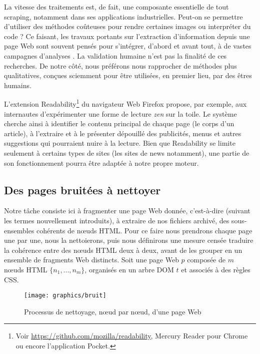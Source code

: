 \documentclass[symmetric,justified,marginals=raggedouter]{tufte-book}
\begin{document}
La vitesse des traitements est, de fait, une composante essentielle de tout scraping, notamment dans ses applications industrielles. Peut-on se permettre d'utiliser des méthodes coûteuses pour rendre certaines images ou interpréter du code ? Ce faisant, les travaux portants sur l'extraction d'information depuis une page Web sont souvent pensés pour s'intégrer, d'abord et avant tout, à de vastes campagnes d'a\-nalyses \citep{weninger_text_2008, adar_web_2009, oita_forest:_2015}. La validation humaine n'est pas la finalité de ces recherches. De notre côté, nous préférons nous rapprocher de méthodes plus qualitatives, conçues sciemment pour être utilisées, en premier lieu, par des êtres humains. 

L'extension Readability\footnote{\RaggedOuter Voir \url{https://github.com/mozilla/readability}, Mercury Reader pour Chrome ou encore l'application Pocket.} du navigateur Web Firefox propose, par exemple, aux internautes d'expérimenter une forme de lecture \textit{zen} sur la toile. Le système cherche ainsi à identifier le contenu principal de chaque page (le corps d'un article), à l'extraire et à le présenter dépouillé des publicités, menus et autres suggestions qui pourraient nuire à la lecture. Bien que Readability se limite seulement à certains types de sites  (les sites de news notamment), une partie de son fonctionnement pourra être adaptée à notre propre moteur. 

\subsection{Des pages bruitées à nettoyer}

\noindent Notre tâche consiste ici à fragmenter une page Web donnée, c'est-à-dire (suivant les termes nouvellement introduits), à extraire de nos fichiers archivé, des sous-ensembles cohérents de nœuds HTML. Pour ce faire nous prendrons chaque page une par une, nous la nettoierons, puis nous définirons une mesure censée traduire la cohérence entre des nœuds HTML deux à deux, avant de les grouper en un ensemble de fragments Web distincts. Soit une page Web $p$ composée de $m$ nœuds HTML $\{n_1,...,n_m\}$, organisés en un arbre DOM $t$ et associés à des règles CSS.

\begin{figure*}%
  \texttt{[image: graphics/bruit]}
  \caption{Processus de nettoyage, nœud par nœud, d'une page Web}
  \label{fig:bruit}
\end{figure*}
\end{document}
